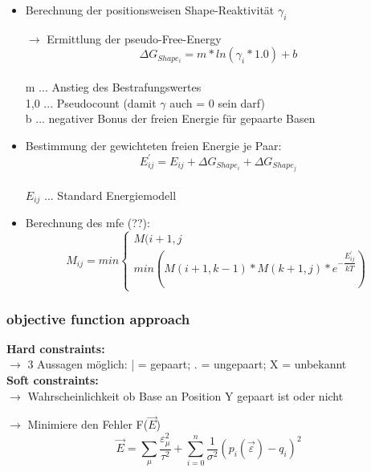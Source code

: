 \begin{itemize}
\item Berechnung der positionsweisen Shape-Reaktivität $\gamma_i$

\item[$\rightarrow$] Ermittlung der pseudo-Free-Energy \\
\begin{equation}
\Delta G_{Shape_i} = m * ln(\gamma_i * 1.0) + b
\end{equation} \\

m ... Anstieg des Bestrafungswertes \\
1,0 ... Pseudocount (damit $\gamma$ auch = 0 sein darf)\\
b ... negativer Bonus der freien Energie für gepaarte Basen \\

\item Bestimmung der gewichteten freien Energie je Paar: \\
\begin{equation}
E^{'}_{ij} = E_{ij} + \Delta G_{Shape_i} + \Delta G_{Shape_j}
\end{equation} \\
$E_{ij}$ ... Standard Energiemodell

\item Berechnung des mfe (??): \\
\begin{equation}
M_{ij} = min
\begin{cases} 
M(i+1,j \\
min (M(i+1,k-1)*M(k+1,j)*e^{-\dfrac{E^{'}_{ij}}{kT}})
\end{cases}
\end{equation}
\end{itemize}

\subsubsection{objective function approach}
\textbf{Hard constraints:} \\
$\rightarrow$ 3 Aussagen möglich: | = gepaart; . = ungepaart; X = unbekannt \\
\textbf{Soft constraints:} \\ 
$\rightarrow$ Wahrscheinlichkeit ob Base an Position Y gepaart ist oder nicht 

$\rightarrow$ Minimiere den Fehler F($\vec{E}$) \\
\begin{equation}
\vec{E} = \sum_{\mu} \dfrac{\varepsilon_{\mu}^{2}}{\tau^2} + \sum_{i = 0}^{n} \dfrac{1}{\sigma^2}(p_i(\vec{\varepsilon}) -q_i)^2
\end{equation} 


